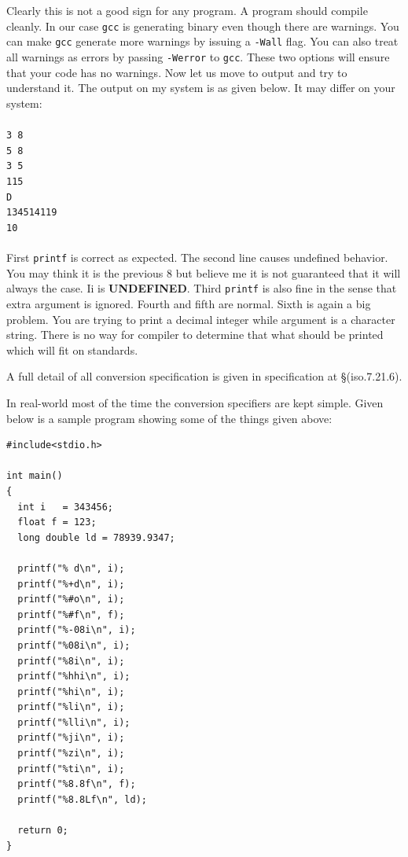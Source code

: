 Clearly this is not a good sign for any program. A program should compile
cleanly. In our case \texttt{gcc} is generating binary even though there are
warnings. You can make \texttt{gcc} generate more warnings by issuing a
\texttt{-Wall} flag. You can also treat all warnings as errors by passing
\texttt{-Werror} to \texttt{gcc}. These two options will ensure that your code
has no warnings. Now let us move to output and try to understand it. The output
on my system is as given below. It may differ on your system:
\\\\\texttt{3 8\\
5 8\\
3 5\\
115\\
D\\
134514119\\
10\\\\}
First \texttt{printf} is correct as expected. The second line causes undefined
behavior. You may think it is the previous 8 but believe me it is not
guaranteed that it will always the case. Ii is \textbf{UNDEFINED}. Third
\texttt{printf} is also fine in the sense that extra argument is
ignored. Fourth and fifth are normal. Sixth is again a big problem. You are
trying to print a decimal integer while argument is a character string. There
is no way for compiler to determine that what should be printed which will fit
on standards.

A full detail of all conversion specification is given in specification at \S(iso.7.21.6).

In real-world most of the time the conversion specifiers are kept simple. Given
below is a sample program showing some of the things given above:

\begin{verbatim}
#include<stdio.h>

int main()
{
  int i   = 343456;
  float f = 123;
  long double ld = 78939.9347;

  printf("% d\n", i);
  printf("%+d\n", i);
  printf("%#o\n", i);
  printf("%#f\n", f);
  printf("%-08i\n", i);
  printf("%08i\n", i);
  printf("%8i\n", i);
  printf("%hhi\n", i);
  printf("%hi\n", i);
  printf("%li\n", i);
  printf("%lli\n", i);
  printf("%ji\n", i);
  printf("%zi\n", i);
  printf("%ti\n", i);
  printf("%8.8f\n", f);
  printf("%8.8Lf\n", ld);

  return 0;
}
\end{verbatim}

